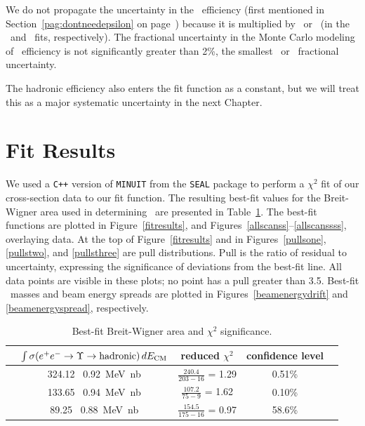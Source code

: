 \documentclass{cornell}
\begin{document}
\label{pag:dontneedepsilon} We do not propagate the uncertainty in the
\tautau\ efficiency (first mentioned in
Section~\ref{pag:dontneedepsilon} on
page~\pageref{pag:dontneedepsilon}) because it is multiplied by \btt\
or \bmm\ (in the \geehadtot\ and \gee\ fits, respectively).  The
fractional uncertainty in the Monte Carlo modeling of \tautau\
efficiency is not significantly greater than 2\%, the smallest \btt\
or \bmm\ fractional uncertainty.

The hadronic efficiency also enters the fit function as a constant,
but we will treat this as a major systematic uncertainty in the next
Chapter.

\section{Fit Results}

We used a {\tt C++} version of {\tt MINUIT} from the {\tt SEAL}
package \cite{seal} to perform a $\chi^2$ fit of our cross-section
data to our fit function.  The resulting best-fit values for the
Breit-Wigner area used in determining \gee\ are presented in
Table~\ref{tab:bestfit}.  The best-fit functions are plotted in
Figure~\ref{fitresults}, and
Figures~\ref{allscanss}--\ref{allscanssss}, overlaying data.  At the
top of Figure~\ref{fitresults} and in Figures~\ref{pullsone},
\ref{pullstwo}, and \ref{pullsthree} are pull distributions.  Pull is
the ratio of residual to uncertainty, expressing the significance of
deviations from the best-fit line.  All data points are visible in
these plots; no point has a pull greater than 3.5.  Best-fit \ups\
masses and beam energy spreads are plotted in
Figures~\ref{beamenergydrift} and \ref{beamenergyspread},
respectively.

\begin{table}
  \caption[Best-fit Breit-Wigner area and $\chi^2$
  significance]{\label{tab:bestfit} Best-fit Breit-Wigner area and
  $\chi^2$ significance.}
  \begin{center}
    \renewcommand{\arraystretch}{1.35}
    \begin{tabular}{c c c c c}
      \hline\hline
      & \mbox{\hspace{-0.5 cm}} $\int \sigma(e^+e^- \to \Upsilon \to \mbox{hadronic}) \, dE_{\mbox{\scriptsize CM}}$ \mbox{\hspace{-0.5 cm}} & reduced $\chi^2$ & confidence level \\\hline
      \us   & 324.12 \PM\ 0.92~MeV~nb & $\displaystyle \frac{240.4}{203-16}$ = 1.29 & 0.51\% \\
      \uss  & 133.65 \PM\ 0.94~MeV~nb & $\displaystyle \frac{107.2}{75-9}$   = 1.62 & 0.10\% \\
      \usss &  89.25 \PM\ 0.88~MeV~nb & $\displaystyle \frac{154.5}{175-16}$ = 0.97 & 58.6\% \\\hline\hline
    \end{tabular}
  \end{center}
\end{table}
    
\end{document}
